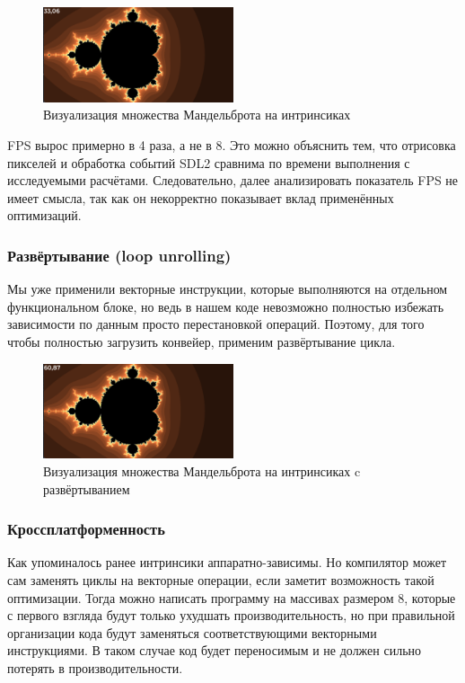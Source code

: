 \documentclass[12pt,a4paper]{article}
\begin{document}
\begin{figure}[ht!]
    \centering
    \includegraphics[width=0.5\textwidth]{mand_avx2.png}
    \caption{Визуализация множества Мандельброта на интринсиках}
    \label{fig:mand_avx2}
\end{figure}

FPS вырос примерно в 4 раза, а не в 8. Это можно объяснить тем, что отрисовка пикселей и обработка событий SDL2 сравнима по времени выполнения с исследуемыми расчётами. Следовательно, далее анализировать показатель FPS не имеет смысла, так как он некорректно показывает вклад применённых оптимизаций.

\subsubsection{Развёртывание (loop unrolling)} 

Мы уже применили векторные инструкции, которые выполняются на отдельном функциональном блоке, но ведь в нашем коде невозможно полностью избежать зависимости по данным просто перестановкой операций. Поэтому, для того чтобы полностью загрузить конвейер, применим развёртывание цикла. 

\begin{figure}[ht!]
    \centering
    \includegraphics[width=0.5\textwidth]{mand_avx2_unroll.png}
    \caption{Визуализация множества Мандельброта на интринсиках c развёртыванием}
    \label{fig:mand_avx2_unroll}
\end{figure}

\subsubsection{Кроссплатформенность} 

Как упоминалось ранее интринсики аппаратно-зависимы. Но компилятор может сам заменять циклы на векторные операции, если заметит возможность такой оптимизации. Тогда можно написать программу на массивах размером 8, которые с первого взгляда будут только ухудшать производительность, но при правильной организации кода будут заменяться соответствующими векторными инструкциями. В таком случае код будет переносимым и не должен сильно потерять в производительности.
\end{document}
